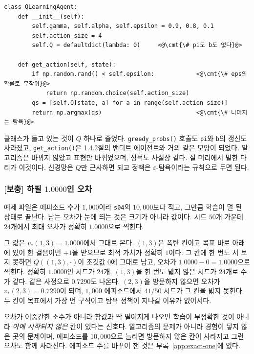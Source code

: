 \documentclass[11pt,a4paper]{article}
\newcommand{\cmt}[1]{\textcolor{codecm}{#1}}   %
\begin{document}
\begin{lstlisting}[caption={샘플 모델 판본 (\texttt{s05\_q\_learning\_simple.py})},label={lst:q-simple}]
class QLearningAgent:
    def __init__(self):
        self.gamma, self.alpha, self.epsilon = 0.9, 0.8, 0.1
        self.action_size = 4
        self.Q = defaultdict(lambda: 0)     <@\cmt{\# pi도 b도 없다}@>

    def get_action(self, state):
        if np.random.rand() < self.epsilon:            <@\cmt{\# eps의 확률로 무작위}@>
            return np.random.choice(self.action_size)
        qs = [self.Q[state, a] for a in range(self.action_size)]
        return np.argmax(qs)                           <@\cmt{\# 나머지는 탐욕}@>
\end{lstlisting}

클래스가 들고 있는 것이 $Q$ 하나로 줄었다. \lstinline|greedy_probs()| 호출도 \lstinline|pi|와
\lstinline|b|의 갱신도 사라졌고, \lstinline|get_action()|은 1.4.2절의 밴디트 에이전트와 거의 같은
모양이 되었다. 알고리즘은 바뀌지 않았고 표현만 바뀌었으며, 성적도 사실상 같다. 절 머리에서 말한
다리가 이것이다. 신경망은 $Q$만 근사하면 되고 정책은 $\varepsilon$-탐욕이라는 규칙으로 두면 된다.

\subsubsection{[보충] 하필 \texorpdfstring{$1.0000$}{1.0000}인 오차}
\label{sec:exact-one}

예제 파일은 에피소드 수가 $1{,}000$이라 \texttt{s04}의 $10{,}000$보다 적고, 그만큼 학습이 덜 된
상태로 끝난다. 남는 오차가 눈에 띄는 것은 크기가 아니라 값이다. 시드 $50$개 가운데 $24$개에서
최대 오차가 정확히 $1.0000$으로 찍힌다.

그 값은 $v_*(1,3) = 1.0000$에서 그대로 온다. $(1,3)$은 폭탄 칸이고 목표 바로 아래에 있어 한
걸음이면 $+1$을 받으므로 최적 가치가 정확히 $1$이다. 그 칸에 한 번도 서 보지 못하면
$Q((1,3),\cdot)$이 초깃값 $0$에 그대로 남고, 오차가 $1.0000 - 0 = 1.0000$으로 찍힌다. 정확히
$1.0000$인 시드가 $24$개, $(1,3)$을 한 번도 밟지 않은 시드가 $24$개로 수가 같다. 같은 사정으로
$0.7290$도 나온다. $(2,3)$을 방문하지 않으면 오차가 $v_*(2,3) = 0.7290$이 되며, $1{,}000$
에피소드에서 $41/50$ 시드가 그 칸을 밟지 못한다. 두 칸이 목표에서 가장 먼 구석이고 탐욕 정책이
지나갈 이유가 없어서다.

오차가 어중간한 소수가 아니라 참값과 딱 떨어지게 나오면 학습이 부정확한 것이 아니라 \emph{아예
시작되지 않은} 칸이 있다는 신호다. 알고리즘의 문제가 아니라 경험이 닿지 않은 곳의 문제이며,
에피소드를 $10{,}000$으로 늘리면 방문하지 않은 칸이 사라지고 그런 오차도 함께 사라진다. 에피소드
수를 바꾸어 잰 것은 부록~\ref{app:exact-one}에 있다.
\end{document}
